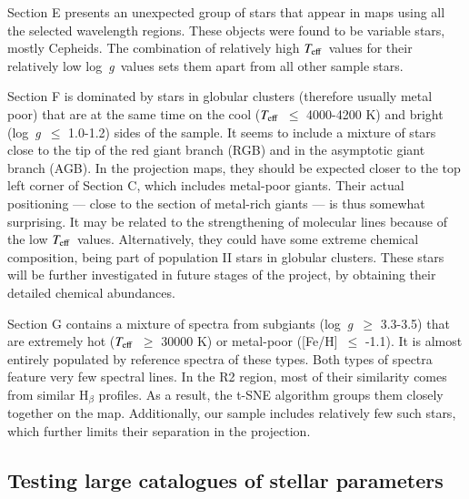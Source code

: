 \documentclass{aa}
\def\teff{$\textit{T}_{\rm{eff}}$}
\def\logg{\mbox{log~{\it g}}}
\begin{document}
Section E presents an unexpected group of stars that appear in maps using all the selected wavelength regions. These objects were found to be variable stars, mostly Cepheids. The combination of relatively high \teff\ values for their relatively low \logg\ values sets them apart from all other sample stars. 

Section F is dominated by stars in globular clusters (therefore usually metal poor) that are at the same time on the cool (\teff~$\leq$ 4000-4200 K) and bright (\logg~$\leq$ 1.0-1.2) sides of the sample. It seems to include a mixture of stars close to the tip of the red giant branch (RGB) and in the asymptotic giant branch (AGB). In the projection maps, they should be expected closer to the top left corner of Section C, which includes metal-poor giants. Their actual positioning --- close to the section of metal-rich giants --- is thus somewhat surprising. It may be related to the strengthening of molecular lines because of the low \teff~values. Alternatively, they could have some extreme chemical composition, being part of population II stars in globular clusters. These stars will be further investigated in future stages of the project, by obtaining their detailed chemical abundances. 

Section G contains a mixture of spectra from subgiants (\logg~$\geq$ 3.3-3.5) that are extremely hot  (\teff~$\geq$ 30000 K) or metal-poor ([Fe/H]~$\leq$ -1.1). It is almost entirely populated by reference spectra of these types. Both types of spectra feature very few spectral lines. In the R2 region, most of their similarity comes from similar H$_\beta$ profiles. As a result, the t-SNE algorithm groups them closely together on the map. Additionally, our sample includes relatively few such stars, which further limits their separation in the projection. 

\subsection{Testing large catalogues of stellar parameters}
\end{document}
